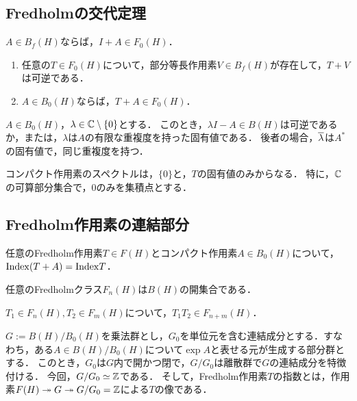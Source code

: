 \documentclass[uplatex,dvipdfmx]{jsreport}
\begin{document}
\subsection{Fredholmの交代定理}

\begin{lemma}
    $A\in B_f(H)$ならば，$I+A\in F_0(H)$．
\end{lemma}

\begin{lemma}\mbox{}
    \begin{enumerate}
        \item 任意の$T\in F_0(H)$について，部分等長作用素$V\in B_f(H)$が存在して，$T+V$は可逆である．
        \item $A\in B_0(H)$ならば，$T+A\in F_0(H)$．
    \end{enumerate}
\end{lemma}

\begin{corollary}
    $A\in B_0(H)$，$\lambda\in\mathbb{C}\setminus\{0\}$とする．
    このとき，$\lambda I-A\in B(H)$は可逆であるか，または，$\lambda$は$A$の有限な重複度を持った固有値である．
    後者の場合，$\overline{\lambda}$は$A^*$の固有値で，同じ重複度を持つ．
\end{corollary}
\begin{remarks}
    コンパクト作用素のスペクトルは，$\{0\}$と，$T$の固有値のみからなる．
    特に，$\mathbb{C}$の可算部分集合で，$0$のみを集積点とする．
\end{remarks}

\subsection{Fredholm作用素の連結部分}

\begin{theorem}
    任意のFredholm作用素$T\in F(H)$とコンパクト作用素$A\in B_0(H)$について，$\mathrm{Index}(T+A)=\mathrm{Index} T$．
\end{theorem}

\begin{proposition}
    任意のFredholmクラス$F_n(H)$は$B(H)$の開集合である．
\end{proposition}

\begin{proposition}
    $T_1\in F_n(H),T_2\in F_m(H)$について，$T_1T_2\in F_{n+m}(H)$．
\end{proposition}

\begin{remarks}
    $G:=B(H)/B_0(H)$を乗法群とし，$G_0$を単位元を含む連結成分とする．すなわち，ある$A\in B(H)/B_0(H)$について$\exp A$と表せる元が生成する部分群とする．
    このとき，$G_0$は$G$内で開かつ閉で，$G/G_0$は離散群で$G$の連結成分を特徴付ける．
    今回，$G/G_0\simeq\mathbb{Z}$である．
    そして，Fredholm作用素$T$の指数とは，作用素$F(H)\twoheadrightarrow G\twoheadrightarrow G/G_0=\mathbb{Z}$による$T$の像である．
\end{remarks}
\end{document}
